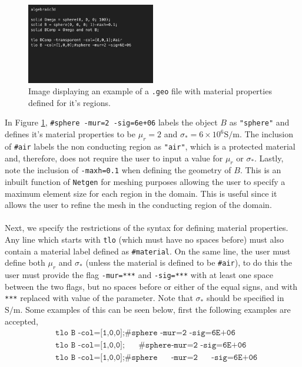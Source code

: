 \begin{figure}[H]
\begin{center}
\includegraphics[width=0.5\textwidth]{Figures/ExampleSphereMaterials.png}
\caption{Image displaying an example of a \texttt{.geo} file with material properties defined for it's regions.}\label{fig:ExampleSphereMaterials}
\end{center}
\end{figure}
\noindent
In Figure \ref{fig:ExampleSphereMaterials}, \texttt{\#sphere -mur=2 -sig=6e+06} labels the object $B$ as \texttt{"sphere"} and defines it's material properties to be $\mu_r=2$ and $\sigma_*=6\times10^6 \text{S/m}$. The inclusion of \texttt{\#air} labels the non conducting region as \texttt{"air"}, which is a protected material and, therefore, does not require the user to input a value for $\mu_r$ or $\sigma_*$. Lastly,  note the inclusion of \texttt{-maxh=0.1} when defining the geometry of $B$. This is an inbuilt function of \texttt{Netgen} for meshing purposes allowing the user to specify a maximum element size for each region in the domain. This is useful since it allows the user to refine the mesh in the conducting region of the domain.\\
\\
Next, we specify the restrictions of the syntax for defining material properties. Any line which starts with \texttt{tlo} (which must have no spaces before) must also contain a material label defined as \texttt{\#material}. On the same line, the user must define both $\mu_r$ and $\sigma_*$ (unless the material is defined to be \texttt{\#air}), to do this the user must provide the flag \texttt{-mur=***} and \texttt{-sig=***} with at least one space between the two flags, but no spaces before or either of the equal signs, and with \texttt{***} replaced with value of the parameter. Note that  $\sigma_*$ should be specified in $\text{S/m}$. Some examples of this can be seen below, first the following examples are accepted,
\begin{align*}
&\texttt{tlo B -col=[1,0,0];\#sphere -mur=2 -sig=6E+06}\\
&\texttt{tlo B -col=[1,0,0];    $\quad$       \#sphere-mur=2 -sig=6E+06}\\
&\texttt{tlo B -col=[1,0,0];\#sphere   $\quad$    -mur=2   $\quad$  -sig=6E+06}
\end{align*}
